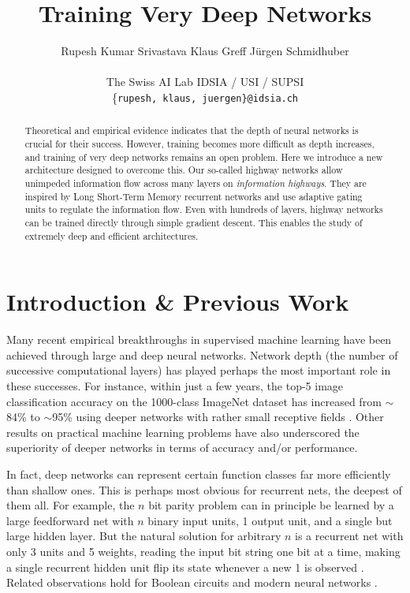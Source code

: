 \documentclass{article}
\title{Training Very Deep Networks}
\author{
Rupesh Kumar Srivastava \quad
Klaus Greff \quad
J{\"u}rgen Schmidhuber\\
\\
The Swiss AI Lab IDSIA /  USI / SUPSI\\
{\{\tt rupesh,\! klaus,\! juergen\}@idsia.ch}\\
}
\begin{document}
\maketitle

\begin{abstract}
Theoretical and empirical evidence indicates that the depth of neural networks is crucial for their success. However, training becomes more difficult as depth increases, and training of very deep networks remains an open problem. Here we introduce a new architecture designed to overcome this. 
Our so-called highway networks allow unimpeded information flow across many layers on \emph{information highways}. 
They are inspired by Long Short-Term Memory recurrent networks and use adaptive gating units to regulate the information flow.
Even with hundreds of layers, highway networks can be trained 
directly through simple gradient descent. This enables the study of extremely deep and efficient architectures.

\end{abstract}

\section{Introduction \& Previous Work}\label{sec:intro}

Many recent empirical breakthroughs in supervised machine learning have been achieved through  large and deep neural networks. Network depth (the number of successive computational layers) has played perhaps the most important role in these successes. For instance, within just a few years, the top-5 image classification accuracy on the 1000-class ImageNet dataset has increased from $\sim$84\% \cite{Krizhevsky2012} to $\sim$95\% \cite{Szegedy2014,Simonyan2014} using deeper networks with rather small receptive fields \cite{Ciresan2011,Ciresan2012}.
Other results on practical machine learning problems have also underscored the superiority of deeper networks \cite{Yu2013} in terms of accuracy and/or performance.

In fact, deep networks can represent certain function classes far more efficiently than shallow ones. This is perhaps most obvious for recurrent nets, the deepest of them all. For example, the $n$ bit parity problem can in principle be learned by a large feedforward net with $n$ binary input units, 1 output unit,  and a single but large hidden layer. But the natural solution for arbitrary $n$ is a recurrent net with only 3 units and 5 weights, reading the input bit string one bit at a time,  making a single recurrent hidden unit flip its state whenever a new 1 is observed \cite{Hochreiter1996}. 
Related observations hold for Boolean circuits \cite{Hastad1987,Hastad1991} and modern neural networks \cite{Bianchini2014,Montufar2014,Martens2014}.
\end{document}
